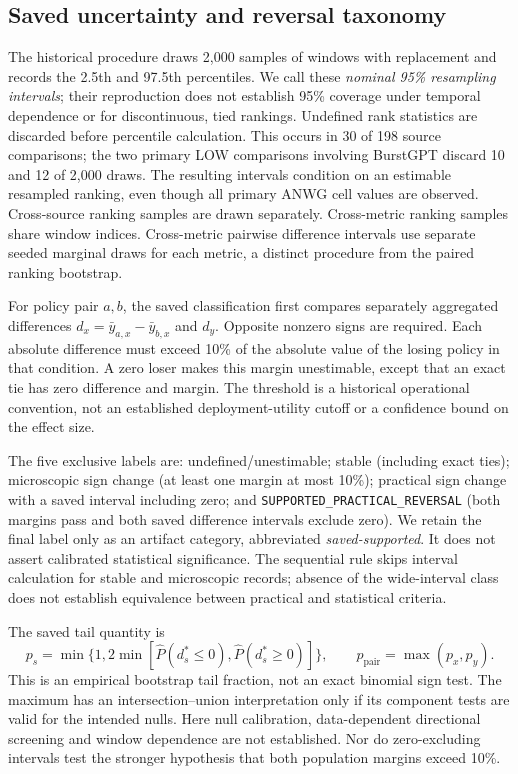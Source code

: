 \subsection{Saved uncertainty and reversal taxonomy}\label{sec:uncertainty}
The historical procedure draws 2,000 samples of windows with replacement
and records the 2.5th and 97.5th percentiles. We call these \emph{nominal
95\% resampling intervals}; their reproduction does not establish 95\%
coverage under temporal dependence or for discontinuous, tied rankings.
Undefined rank statistics are discarded before percentile calculation.
This occurs in 30 of 198 source comparisons; the two primary LOW
comparisons involving BurstGPT discard 10 and 12 of 2,000 draws.
The resulting intervals condition on an estimable resampled ranking,
even though all primary ANWG cell values are observed.
Cross-source ranking samples are drawn separately. Cross-metric ranking
samples share window indices. Cross-metric pairwise difference intervals
use separate seeded marginal draws for each metric, a distinct procedure
from the paired ranking bootstrap.

For policy pair $a,b$, the saved classification first compares separately
aggregated differences $d_x=\bar y_{a,x}-\bar y_{b,x}$ and $d_y$.
Opposite nonzero signs are required. Each absolute difference must exceed
10\% of the absolute value of the losing policy in that condition. A zero
loser makes this margin unestimable, except that an exact tie has zero
difference and margin. The threshold is a historical operational
convention, not an established deployment-utility cutoff or a confidence
bound on the effect size.

The five exclusive labels are: undefined/unestimable; stable (including
exact ties); microscopic sign change (at least one margin at most 10\%);
practical sign change with a saved interval including zero; and
\texttt{SUPPORTED\_PRACTICAL\_REVERSAL} (both margins pass and both
saved difference intervals exclude zero). We retain the final label only
as an artifact category, abbreviated \emph{saved-supported}. It does not
assert calibrated statistical significance. The sequential rule skips
interval calculation for stable and microscopic records; absence of the
wide-interval class does not establish equivalence between practical and
statistical criteria.

The saved tail quantity is
\begin{equation}
 p_s=\min\{1,2\min[\widehat P(d_s^*\leq0),
                         \widehat P(d_s^*\geq0)]\},\qquad
 p_{\mathrm{pair}}=\max(p_x,p_y).
\end{equation}
This is an empirical bootstrap tail fraction, not an exact binomial sign
test. The maximum has an intersection--union interpretation only if its
component tests are valid for the intended nulls. Here null calibration,
data-dependent directional screening and window dependence are not
established. Nor do zero-excluding intervals test the stronger hypothesis
that both population margins exceed 10\%.

